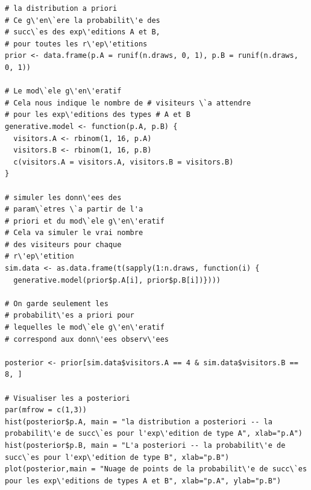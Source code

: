 \begin{Exemple}
\begin{lstlisting}
# la distribution a priori
# Ce g\'en\`ere la probabilit\'e des
# succ\`es des exp\'editions A et B, 
# pour toutes les r\'ep\'etitions
prior <- data.frame(p.A = runif(n.draws, 0, 1), p.B = runif(n.draws, 0, 1))

# Le mod\`ele g\'en\'eratif
# Cela nous indique le nombre de # visiteurs \`a attendre
# pour les exp\'editions des types # A et B 
generative.model <- function(p.A, p.B) {
  visitors.A <- rbinom(1, 16, p.A)
  visitors.B <- rbinom(1, 16, p.B)
  c(visitors.A = visitors.A, visitors.B = visitors.B)
}

# simuler les donn\'ees des 
# param\`etres \`a partir de l'a 
# priori et du mod\`ele g\'en\'eratif 
# Cela va simuler le vrai nombre 
# des visiteurs pour chaque 
# r\'ep\'etition
sim.data <- as.data.frame(t(sapply(1:n.draws, function(i) {
  generative.model(prior$p.A[i], prior$p.B[i])})))

# On garde seulement les 
# probabilit\'es a priori pour 
# lequelles le mod\`ele g\'en\'eratif
# correspond aux donn\'ees observ\'ees 

posterior <- prior[sim.data$visitors.A == 4 & sim.data$visitors.B == 8, ] 

# Visualiser les a posteriori
par(mfrow = c(1,3))
hist(posterior$p.A, main = "la distribution a posteriori -- la probabilit\'e de succ\`es pour l'exp\'edition de type A", xlab="p.A") 
hist(posterior$p.B, main = "L'a posteriori -- la probabilit\'e de succ\`es pour l'exp\'edition de type B", xlab="p.B")
plot(posterior,main = "Nuage de points de la probabilit\'e de succ\`es pour les exp\'editions de types A et B", xlab="p.A", ylab="p.B")
\end{lstlisting}


\end{Exemple}
